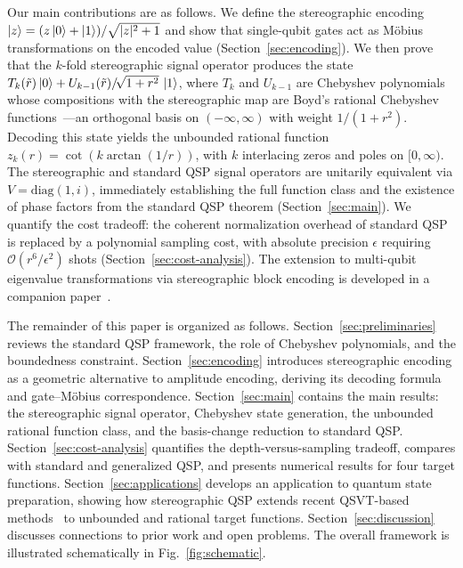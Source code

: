 
Our main contributions are as follows.  We define the stereographic
encoding $\ket{z} = (z\ket{0}+\ket{1})/\sqrt{|z|^2+1}$ and show
that single-qubit gates act as M\"obius transformations on the encoded
value (Section~\ref{sec:encoding}).  We then prove that the $k$-fold
stereographic signal operator produces the state
$T_k(\tilde{r})\ket{0} + U_{k-1}(\tilde{r})/\!\sqrt{1+r^2}\,\ket{1}$,
where $T_k$ and $U_{k-1}$ are Chebyshev polynomials whose compositions
with the stereographic map are Boyd's rational Chebyshev
functions~\cite{Boyd1990}---an orthogonal basis on
$(-\infty,\infty)$ with weight $1/(1+r^2)$.  Decoding this state
yields the unbounded rational function
$z_k(r) = \cot(k\arctan(1/r))$, with $k$ interlacing zeros and poles
on $[0,\infty)$.  The stereographic and standard QSP signal operators
are unitarily equivalent via $V = \mathrm{diag}(1,i)$, immediately
establishing the full function class and the existence of phase
factors from the standard QSP theorem (Section~\ref{sec:main}).
We quantify the cost tradeoff: the coherent normalization overhead of
standard QSP is replaced by a polynomial sampling cost, with
absolute precision $\epsilon$ requiring
$\mathcal{O}(r^6/\epsilon^2)$ shots
(Section~\ref{sec:cost-analysis}).  The extension to multi-qubit
eigenvalue transformations via stereographic block encoding is
developed in a companion paper~\cite{KharaziLeytonOrtega2026b}.


The remainder of this paper is organized as follows.
Section~\ref{sec:preliminaries} reviews the standard QSP framework,
the role of Chebyshev polynomials, and the boundedness constraint.
Section~\ref{sec:encoding} introduces stereographic encoding as a
geometric alternative to amplitude encoding, deriving its decoding
formula and gate--M\"obius correspondence.
Section~\ref{sec:main} contains the main results: the stereographic
signal operator, Chebyshev state generation, the unbounded rational
function class, and the basis-change reduction to standard QSP.
Section~\ref{sec:cost-analysis} quantifies the depth-versus-sampling
tradeoff, compares with standard and generalized QSP, and presents
numerical results for four target functions.
Section~\ref{sec:applications} develops an application to quantum
state preparation, showing how stereographic QSP extends recent
QSVT-based methods~\cite{McArdleGilyenBerta2025} to unbounded and
rational target functions.
Section~\ref{sec:discussion} discusses connections to prior work
and open problems.  The overall framework is illustrated
schematically in Fig.~\ref{fig:schematic}.
